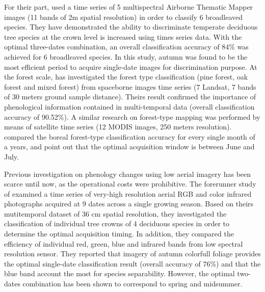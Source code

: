 \documentclass[remotesensing,article,submit,moreauthors,pdftex,12pt,a4paper]{mdpi} %
\begin{document}
For their part, \citeauthor{hill_mapping_2010} \cite{hill_mapping_2010} used a time series of 5 multispectral Airborne Thematic Mapper images (11 bands of 2m spatial resolution) in order to classify 6 broadleaved species. 
They have demonstrated the ability to discriminate temperate deciduous tree species at the crown level is increased using times series data. 
With the optimal three-dates combination, an overall classification accuracy of 84\% was achieved for 6 broadleaved species. 
In this study, autumn was found to be the most efficient period to acquire single-date images for discrimination purpose. 
At the forest scale, \citeauthor{zhu_accurate_2014} \cite{zhu_accurate_2014} has investigated the forest type classification (pine forest, oak forest and mixed forest) from spaceborne images time series (7 Landsat, 7 bands of 30 meters ground sample distance). 
Theirs result confirmed the importance of phenological information contained in multi-temporal data (overall classification accuracy of 90.52\%). 
A similar research on forest-type mapping was performed by means of satellite time series (12 MODIS images, 250 meters resolution). 
\citeauthor{kempeneers_data_2011} \cite{kempeneers_data_2011} compared the boreal forest-type classification accuracy for every single month of a years, and point out that the optimal acquisition window is between June and July.


Previous investigation on phenology changes using low aerial imagery has been scarce until now, as the operational costs were prohibitive. 
The forerunner study of \citeauthor{key_comparison_2001} \cite{key_comparison_2001} examined a time series of very-high resolution aerial RGB and color infrared photographs acquired at 9 dates across a single growing season. 
Based on theirs mutitemporal dataset of 36 cm spatial resolution, they investigated the classification of individual tree crowns of 4 deciduous species in order to determine the optimal acquisition timing. 
In addition, they compared the efficiency of individual red, green, blue and infrared bands from low spectral resolution sensor. 
They reported that imagery of autumn colorfull foliage provides the optimal single-date classification result (overall accuracy of 76\%) and that the blue band account the most for species separability. 
However, the optimal two-dates combination has been shown to correspond to spring and midsummer. 
\end{document}
